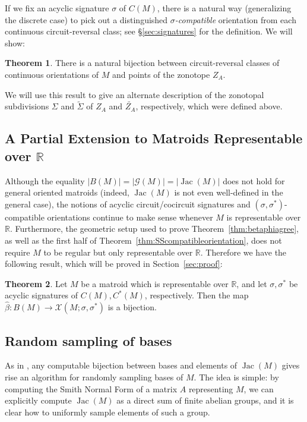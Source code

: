 \documentclass[12pt]{amsart}
\numberwithin{equation}{section}
\theoremstyle{definition}
\newtheorem{theorem}{Theorem}[subsection]
\newcommand{\Jac}{\operatorname{Jac}}
\begin{document}
If we fix an acyclic signature $\sigma$ of $C(M)$, there is a natural way (generalizing the discrete case) to pick out a distinguished {\em $\sigma$-compatible} orientation from each continuous circuit-reversal class; see \S\ref{sec:signatures} for the definition.  We will show:

\begin{theorem} 
There is a natural bijection between circuit-reversal classes of continuous orientations of $M$ and points of the zonotope $Z_A$.  
\end{theorem}

We will use this result to give an alternate description of the zonotopal subdivisions $\Sigma$ and $\widetilde{\Sigma}$ of $Z_A$ and $\widetilde{Z_A}$, respectively, which were defined above.

\subsection{A Partial Extension to Matroids Representable over $\mathbb{R}$} \label{sec:realizablecase}

Although the equality $|B(M)|=|\mathcal{G}(M)|=|\Jac(M)|$ does not hold for general oriented matroids (indeed, $\Jac(M)$ is not even well-defined in the general case), the notions of acyclic circuit/cocircuit signatures and $(\sigma,\sigma^*)$-compatible orientations continue to make sense whenever $M$ is representable over ${\mathbb{R}}$. Furthermore, the geometric setup used to prove Theorem~\ref{thm:betaphiagree}, as well as the first half of Theorem~\ref{thm:SScompatibleorientation}, does not require $M$ to be regular but only representable over $\mathbb{R}$. Therefore we have the following result, which will be proved in Section~\ref{sec:proof}:


\begin{theorem} \label{thm:realizablemainthm}
Let $M$ be a matroid which is representable over $\mathbb{R}$, and let $\sigma,\sigma^*$ be acyclic signatures of $C(M),C^*(M)$, respectively. Then the map $\hat{\beta}:B(M)\rightarrow\mathcal{X}(M;\sigma,\sigma^*)$ is a bijection.
\end{theorem}

\subsection{Random sampling of bases} 

As in \cite{baker2013chip}, any computable bijection between bases and elements of $\Jac(M)$ gives rise an algorithm for randomly sampling bases of $M$. The idea is simple: by computing the Smith Normal Form of a matrix $A$ representing $M$, we can explicitly compute $\Jac(M)$ as a direct sum of finite abelian groups, and it is clear how to uniformly sample elements of such a group.
\end{document}
